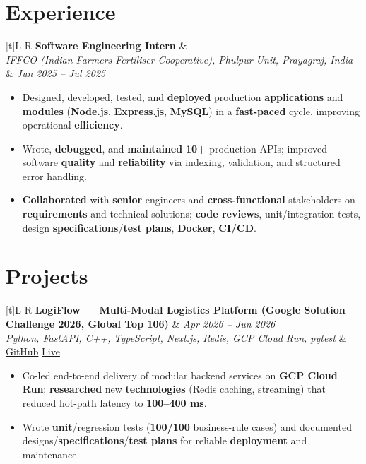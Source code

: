 \documentclass[a4paper,10pt]{article}
\newcommand{\resumeSubheading}[4]{%
  \vspace{0.5mm}
  \noindent
  \begin{tabularx}{\textwidth}[t]{L R}
    \textbf{#1} & #4 \\
    \textit{#3} & \textit{#2} \\
  \end{tabularx}
  \vspace{-0.5mm}%
}
\newcommand{\resumeProject}[4]{%
  \vspace{0.5mm}
  \noindent
  \begin{tabularx}{\textwidth}[t]{L R}
    \textbf{#1} & \textit{#3} \\
    \textit{#2} & #4 \\
  \end{tabularx}
  \vspace{-0.5mm}%
}
\begin{document}
\section{Experience}
\small
\resumeSubheading
  {Software Engineering Intern}{Jun 2025 -- Jul 2025}
  {IFFCO (Indian Farmers Fertiliser Cooperative), Phulpur Unit, Prayagraj, India}{}
\begin{itemize}
  \item Designed, developed, tested, and \textbf{deployed} production \textbf{applications} and \textbf{modules} (\textbf{Node.js}, \textbf{Express.js}, \textbf{MySQL}) in a \textbf{fast-paced} cycle, improving operational \textbf{efficiency}.
  \item Wrote, \textbf{debugged}, and \textbf{maintained} \textbf{10+} production APIs; improved software \textbf{quality} and \textbf{reliability} via indexing, validation, and structured error handling.
  \item \textbf{Collaborated} with \textbf{senior} engineers and \textbf{cross-functional} stakeholders on \textbf{requirements} and technical solutions; \textbf{code reviews}, unit/integration tests, design \textbf{specifications}/\textbf{test plans}, \textbf{Docker}, \textbf{CI/CD}.
\end{itemize}

\section{Projects}
\small

\resumeProject
  {LogiFlow --- Multi-Modal Logistics Platform (Google Solution Challenge 2026, Global Top 106)}
  {Python, FastAPI, C++, TypeScript, Next.js, Redis, GCP Cloud Run, pytest}
  {Apr 2026 -- Jun 2026}
  {\href{https://github.com/Ojas-Srivastava05/LogiFlow-Solution-Challenge-2026}{GitHub} \textbar{} \href{https://logi-flow-solution-challenge-2026.vercel.app/}{Live}}
\begin{itemize}
  \item Co-led end-to-end delivery of modular backend services on \textbf{GCP Cloud Run}; \textbf{researched} new \textbf{technologies} (Redis caching, streaming) that reduced hot-path latency to \textbf{100--400 ms}.
  \item Wrote \textbf{unit}/regression tests (\textbf{100/100} business-rule cases) and documented designs/\textbf{specifications}/\textbf{test plans} for reliable \textbf{deployment} and maintenance.
\end{itemize}
\end{document}
